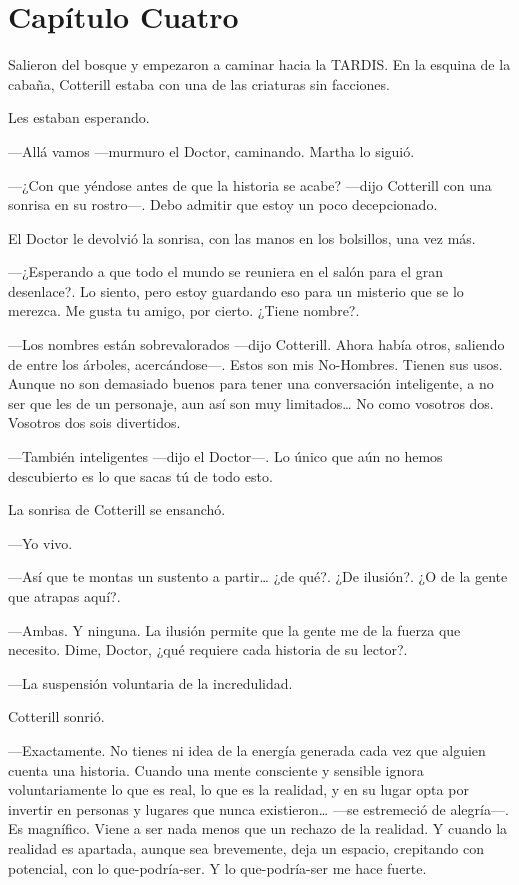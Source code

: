 \chapter*{Capítulo Cuatro} 

Salieron del bosque y empezaron a caminar hacia la TARDIS. En la esquina de la cabaña, Cotterill estaba con una de las criaturas sin facciones.

Les estaban esperando.

---Allá vamos ---murmuro el Doctor, caminando. Martha lo siguió.

---¿Con que yéndose antes de que la historia se acabe? ---dijo Cotterill con una sonrisa en su rostro---. Debo admitir que estoy un poco decepcionado.

El Doctor le devolvió la sonrisa, con las manos en los bolsillos, una vez más.

---¿Esperando a que todo el mundo se reuniera en el salón para el gran desenlace?. Lo siento, pero estoy guardando eso para un misterio que se lo merezca. Me gusta tu amigo, por cierto. ¿Tiene nombre?.

---Los nombres están sobrevalorados ---dijo Cotterill. Ahora había otros, saliendo de entre los árboles, acercándose---. Estos son mis No-Hombres. Tienen sus usos. Aunque no son demasiado buenos para tener una conversación inteligente, a no ser que les de un personaje, aun así son muy limitados\ldots{} No como vosotros dos. Vosotros dos sois divertidos.

---También inteligentes ---dijo el Doctor---. Lo único que aún no hemos descubierto es lo que sacas tú de todo esto.

La sonrisa de Cotterill se ensanchó.

---Yo vivo.

---Así que te montas un sustento a partir\ldots{} ¿de qué?. ¿De ilusión?. ¿O de la gente que atrapas aquí?.

---Ambas. Y ninguna. La ilusión permite que la gente me de la fuerza que necesito. Dime, Doctor, ¿qué requiere cada historia de su lector?.

---La suspensión voluntaria de la incredulidad.

Cotterill sonrió.

---Exactamente. No tienes ni idea de la energía generada cada vez que alguien cuenta una historia. Cuando una mente consciente y sensible ignora voluntariamente lo que es real, lo que es la realidad, y en su lugar opta por invertir en personas y lugares que nunca existieron\ldots{} ---se estremeció de alegría---. Es magnífico. Viene a ser nada menos que un rechazo de la realidad. Y cuando la realidad es apartada, aunque sea brevemente, deja un espacio, crepitando con potencial, con lo que-podría-ser. Y lo que-podría-ser me hace fuerte.

